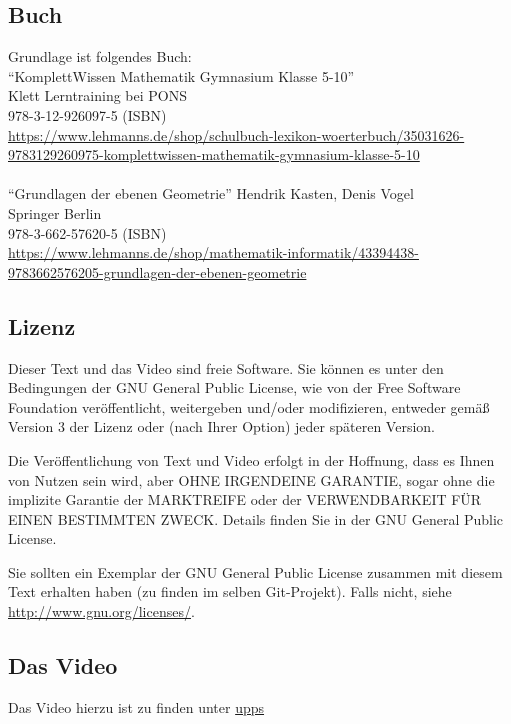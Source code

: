 \documentclass[a4paper]{amsart}
\theoremstyle{definition}
\begin{document}
\subsection*{Buch}
Grundlage ist folgendes Buch:\\

"`KomplettWissen Mathematik Gymnasium Klasse 5-10"'\\
Klett Lerntraining bei PONS\\
978-3-12-926097-5 (ISBN)\\
{\tiny
   \url{https://www.lehmanns.de/shop/schulbuch-lexikon-woerterbuch/35031626-9783129260975-komplettwissen-mathematik-gymnasium-klasse-5-10
   }
}\\
\\
"`Grundlagen der ebenen Geometrie"'
Hendrik Kasten, Denis Vogel\\
Springer Berlin\\
978-3-662-57620-5 (ISBN)\\
{\tiny
   \url{
      https://www.lehmanns.de/shop/mathematik-informatik/43394438-9783662576205-grundlagen-der-ebenen-geometrie
   }
}

\subsection*{Lizenz}
Dieser Text und das Video sind freie Software. Sie können es unter den Bedingungen der 
GNU General Public License, wie von der Free Software Foundation veröffentlicht, weitergeben 
und/oder modifizieren, entweder gemäß Version 3 der Lizenz oder (nach Ihrer Option) jeder späteren Version.

Die Veröffentlichung von Text und Video erfolgt in der Hoffnung, dass es Ihnen von Nutzen sein wird, 
aber OHNE IRGENDEINE GARANTIE, sogar ohne die implizite Garantie der MARKTREIFE oder der 
VERWENDBARKEIT FÜR EINEN BESTIMMTEN ZWECK. Details finden Sie in der GNU General Public License.

Sie sollten ein Exemplar der GNU General Public License zusammen mit diesem Text erhalten haben 
(zu finden im selben Git-Projekt). 
Falls nicht, siehe \url{http://www.gnu.org/licenses/}.

\subsection*{Das Video}
Das Video hierzu ist zu finden unter 
{\tiny
   \url{upps}
}
\end{document}
